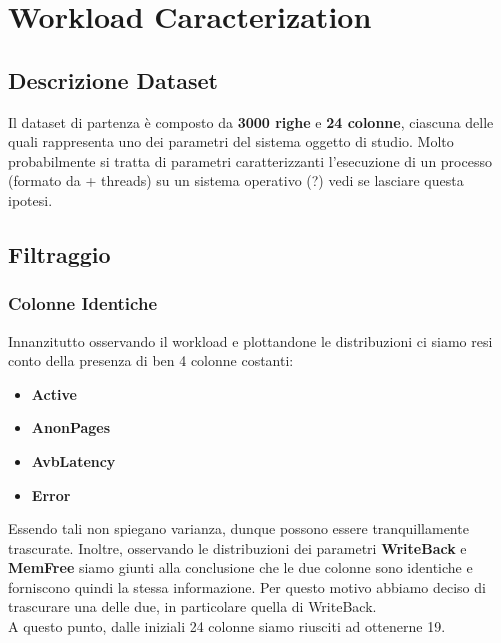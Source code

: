 \chapter{Workload Caracterization}

\section{Descrizione Dataset}
Il dataset di partenza è composto da \textbf{3000 righe} e \textbf{24 colonne}, ciascuna delle quali rappresenta uno dei parametri del sistema oggetto di studio. Molto probabilmente si tratta di parametri caratterizzanti l'esecuzione di un processo (formato da + threads) su un sistema operativo (?) vedi se lasciare questa ipotesi.

\section{Filtraggio}

\subsection{Colonne Identiche}
Innanzitutto osservando il workload e plottandone le distribuzioni ci siamo resi conto della presenza di ben 4 colonne costanti:

\begin{itemize}
	\item \textbf{Active}
	\item \textbf{AnonPages}
	\item \textbf{AvbLatency}
	\item \textbf{Error}
\end{itemize}
Essendo tali non spiegano varianza, dunque possono essere tranquillamente trascurate.
Inoltre, osservando le distribuzioni dei parametri \textbf{WriteBack} e \textbf{MemFree} siamo giunti alla conclusione che le due colonne sono identiche e forniscono quindi la stessa informazione. Per questo motivo abbiamo deciso di trascurare una delle due, in particolare quella di WriteBack.
\\
A questo punto, dalle iniziali 24 colonne siamo riusciti ad ottenerne 19.

